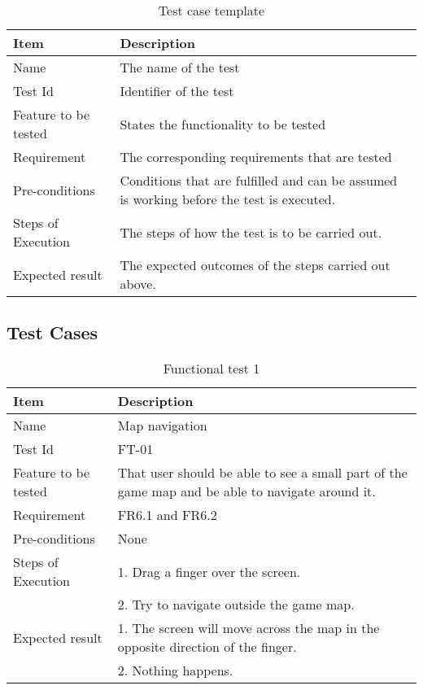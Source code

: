 \begin{table}[H]
\centering
	\begin{tabular}{ l | p{8cm} }
		\hline
		{\bf Item} & {\bf Description} \\ \hline
		Name & The name of the test \\ 
		Test Id & Identifier of the test \\ 
		Feature to be tested & States the functionality to be tested \\ 
		Requirement & The corresponding requirements that are tested \\ 
		Pre-conditions & Conditions that are fulfilled and can be assumed is working before the test is executed. \\ 
		Steps of Execution & The steps of how the test is to be carried out. \\ 
		Expected result & The expected outcomes of the steps carried out above. \\ 
	\end{tabular}
	\caption{Test case template}
\end{table}

\subsection{Test Cases}

\begin{table}[H]
\centering
	\begin{tabular}{ l | p{8cm} }
		\hline
		{\bf Item} & {\bf Description} \\ \hline
		Name & Map navigation \\ 
		Test Id & FT-01 \\ 
		Feature to be tested & That user should be able to see a small part of the game map and be able to navigate around it.\\ 
		Requirement & FR6.1 and FR6.2 \\ 
		Pre-conditions & None \\ 
		Steps of Execution & 1. Drag a finger over the screen. \\
		& 2. Try to navigate outside the game map. \\
		Expected result & 1. The screen will move across the map in the opposite direction of the finger.\\ 
		& 2. Nothing happens. \\
	\end{tabular}
	\caption{Functional test 1}
\end{table}


